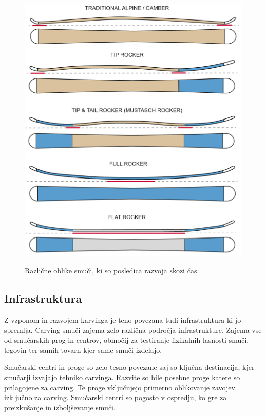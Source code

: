 \documentclass{article}
\begin{document}
\begin{figure}
    \centering
    \includegraphics[scale=0.2]{../images/rocker profiles.png} \\
    \caption[short]{Različne oblike smuči, ki so posledica razvoja skozi čas.}
\end{figure}

\subsection*{Infrastruktura}
Z vzponom in razvojem karvinga je teno povezana tudi infrastruktura ki jo spremlja.
Carving smuči zajema zelo različna področja infrastrukture. Zajema vse od smučarskih prog in centrov, območij za testiranje fizikalnih lasnosti smuči, trgovin ter samih tovarn kjer same smuči izdelajo.

Smučarski centri in proge so zelo tesno povezane saj so ključna destinacija, kjer smučarji izvajajo tehniko carvinga.
Razvite so bile posebne proge katere so prilagojene za carving. Te proge vključujejo primerno oblikovanje zavojev izključno za carving.
Smučarski centri so pogosto v ospredju, ko gre za preizkušanje in izboljševanje smuči.
\end{document}

